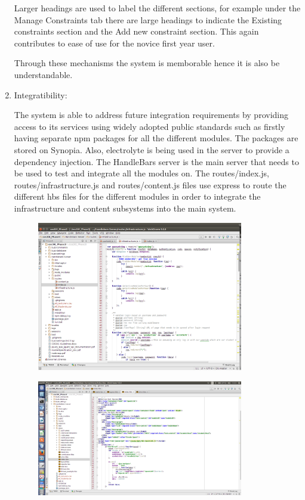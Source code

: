 \documentclass[hidelinks, 12pt, oneside]{article}
\begin{document}
\begin{enumerate}
Larger headings are used to label the different sections, for example under the Manage Constraints tab there are large headings to indicate the Existing constraints section and the Add new constraint section. This again contributes to ease of use for the novice first year user.

Through these mechanisms the system is memborable hence it is also be understandable.  

\item Integratibility:

The system is able to address future integration requirements by providing access to its services using widely adopted public standards such as firstly having separate npm packages for all the different modules. The packages are stored on Synopia. Also, electrolyte is being used in the server to provide a dependency injection. The HandleBars server is the main server that needs to be used to test and integrate all the modules on. The routes/index.js, routes/infrastructure.js and routes/content.js files use express to route the different hbs files for the different modules in order to integrate the infrastructure and content subsystems into the main system. 

\begin{figure}[h!]
  \centering
    \includegraphics[width=0.85\textwidth]{IndexContentInfra} 
\end{figure}

\begin{figure}[h!]
  \centering
    \includegraphics[width=0.85\textwidth]{HbsFiles} 
\end{figure}


\end{enumerate}
\end{document}
